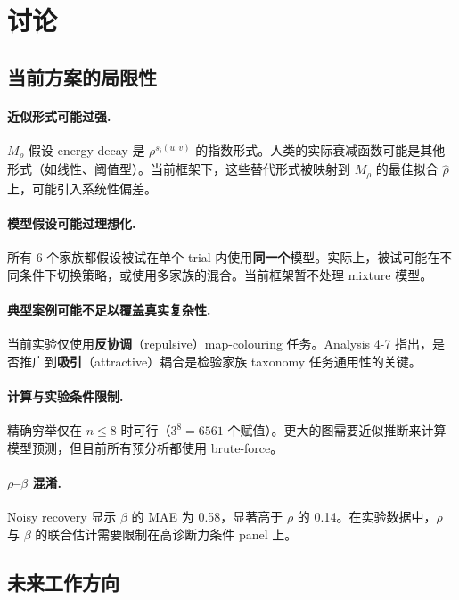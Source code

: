 \documentclass[11pt,a4paper]{ctexart}
\begin{document}
\section{讨论}
\label{sec:discussion}

\subsection{当前方案的局限性}

\paragraph{近似形式可能过强.}
$M_\rho$ 假设 energy decay 是 $\rho^{s_i(u,v)}$ 的指数形式。人类的实际衰减函数可能是其他形式（如线性、阈值型）。当前框架下，这些替代形式被映射到 $M_\rho$ 的最佳拟合 $\hat\rho$ 上，可能引入系统性偏差。

\paragraph{模型假设可能过理想化.}
所有 6 个家族都假设被试在单个 trial 内使用\textbf{同一个}模型。实际上，被试可能在不同条件下切换策略，或使用多家族的混合。当前框架暂不处理 mixture 模型。

\paragraph{典型案例可能不足以覆盖真实复杂性.}
当前实验仅使用\textbf{反协调}（repulsive）map-colouring 任务。Analysis 4-7 指出，是否推广到\textbf{吸引}（attractive）耦合是检验家族 taxonomy 任务通用性的关键。

\paragraph{计算与实验条件限制.}
精确穷举仅在 $n\le 8$ 时可行（$3^8=6561$ 个赋值）。更大的图需要近似推断来计算模型预测，但目前所有预分析都使用 brute-force。

\paragraph{$\rho$--$\beta$ 混淆.}
Noisy recovery 显示 $\beta$ 的 MAE 为 0.58，显著高于 $\rho$ 的 0.14。在实验数据中，$\rho$ 与 $\beta$ 的联合估计需要限制在高诊断力条件 panel 上。

\subsection{未来工作方向}
\end{document}
